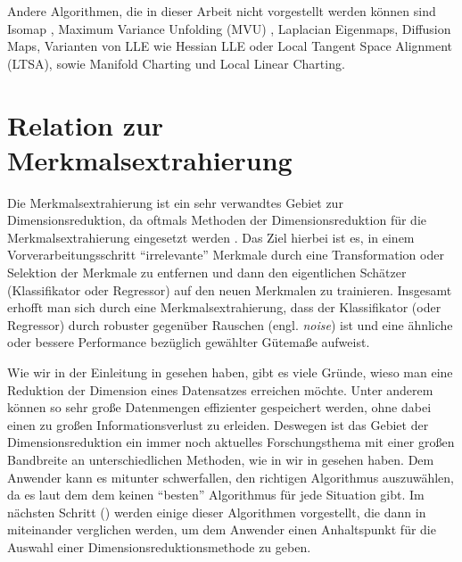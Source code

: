 Andere Algorithmen, die in dieser Arbeit nicht vorgestellt werden können sind Isomap \parencite{Tenenbaum.2000}, Maximum Variance Unfolding (MVU) \parencite{Weinberger.2006}, Laplacian Eigenmaps, Diffusion Maps, Varianten von LLE wie Hessian LLE
oder Local Tangent Space Alignment (LTSA), sowie Manifold Charting und Local Linear
Charting.\addref

\section{Relation zur Merkmalsextrahierung}
\label{ch:Dimensionsreduktion:Merkmalsextrahierung}

Die Merkmalsextrahierung ist ein sehr verwandtes Gebiet zur Dimensionsreduktion, da oftmals
Methoden der Dimensionsreduktion für die Merkmalsextrahierung eingesetzt werden \parencite[3]{Guyon.2006b}. Das Ziel hierbei ist es, in einem Vorverarbeitungsschritt
\enquote{irrelevante} Merkmale durch eine Transformation oder Selektion der Merkmale zu entfernen
und dann den eigentlichen Schätzer (Klassifikator oder Regressor) auf den neuen Merkmalen zu
trainieren. Insgesamt erhofft man sich durch eine Merkmalsextrahierung, dass der Klassifikator
(oder Regressor) durch robuster gegenüber Rauschen (engl. \textit{noise}) ist und eine ähnliche
oder bessere Performance bezüglich gewählter Gütemaße aufweist.

Wie wir in der Einleitung in  gesehen haben, gibt es viele Gründe, wieso man
eine Reduktion der Dimension eines Datensatzes erreichen möchte. Unter anderem können so sehr große
Datenmengen effizienter gespeichert werden, ohne dabei einen zu großen Informationsverlust zu
erleiden. Deswegen ist das Gebiet der Dimensionsreduktion ein immer noch aktuelles Forschungsthema
mit einer großen Bandbreite an unterschiedlichen Methoden, wie in wir in
 gesehen haben. Dem Anwender kann es mitunter schwerfallen,
den richtigen Algorithmus auszuwählen, da es laut dem dem  \parencite{Wolpert.1997} keinen \enquote{besten} Algorithmus für jede Situation gibt. Im nächsten
Schritt () werden einige dieser Algorithmen vorgestellt, die dann in
 miteinander verglichen werden, um dem Anwender einen Anhaltspunkt für die
Auswahl einer Dimensionsreduktionsmethode zu geben.